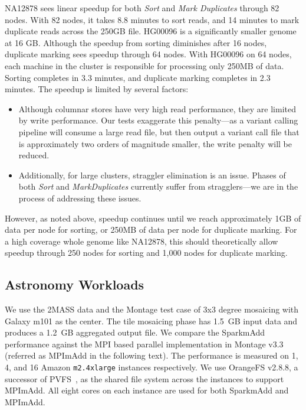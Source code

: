 \documentclass{acm_proc_article-sp}
\begin{document}
NA12878 sees linear speedup for both \textit{Sort} and \textit{Mark Duplicates} through 82 nodes. With
82 nodes, it takes 8.8 minutes to sort reads, and 14 minutes to mark duplicate reads across the 250GB
file. HG00096 is a significantly smaller genome at 16 GB. Although the speedup from sorting diminishes
after 16 nodes, duplicate marking sees speedup through 64 nodes. With HG00096 on 64 nodes, each
machine in the cluster is responsible for processing only 250MB of data. Sorting completes in 3.3
minutes, and duplicate marking completes in 2.3 minutes. The speedup is limited by several factors:

\begin{itemize}
\item Although columnar stores have very high read performance, they are limited by write performance.
Our tests exaggerate this penalty---as a variant calling pipeline will consume a large read file, but then
output a variant call file that is approximately two orders of magnitude smaller, the write penalty will be
reduced.
\item Additionally, for large clusters, straggler elimination is an issue. Phases of both \textit{Sort} and
\textit{MarkDuplicates} currently suffer from stragglers---we are in the process of addressing these
issues.
\end{itemize}

However, as noted above, speedup continues until we reach approximately 1GB of data per node for
sorting, or 250MB of data per node for duplicate marking. For a high coverage whole genome like
NA12878, this should theoretically allow speedup through 250 nodes for sorting and 1,000 nodes for
duplicate marking.

\subsection{Astronomy Workloads}
\label{sec:astro-workloads}

We use the 2MASS data and the Montage test case of 3x3 degree mosaicing with Galaxy m101 as the
center.  The tile mosaicing phase has 1.5~GB input data and produces a 1.2~GB aggregated output file.
We compare the SparkmAdd performance against the MPI based parallel implementation in Montage v3.3
(referred as MPImAdd in the following text). The performance is measured on 1, 4, and 16 Amazon
\texttt{m2.4xlarge} instances respectively. We use OrangeFS v2.8.8, a successor of PVFS~\cite{PVFS}, as
the shared file system across the instances to support MPImAdd. All eight cores on each instance are used
for both SparkmAdd and MPImAdd.
\end{document}
